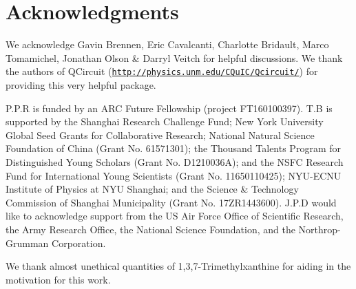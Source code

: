 %
%

\section*{Acknowledgments}

We acknowledge Gavin Brennen, Eric Cavalcanti, Charlotte Bridault, Marco Tomamichel, Jonathan Olson \& Darryl Veitch for helpful discussions. We thank the authors of QCircuit (\texttt{\href{http://physics.unm.edu/CQuIC/Qcircuit/}{http://physics.unm.edu/CQuIC/Qcircuit/}}) for providing this very helpful package.

 P.P.R is funded by an ARC Future Fellowship (project FT160100397). T.B is supported by the Shanghai Research Challenge Fund; New York University Global Seed Grants for Collaborative Research; National Natural Science Foundation of China (Grant No. 61571301); the Thousand Talents Program for Distinguished Young Scholars (Grant No. D1210036A); and the NSFC Research Fund for International Young Scientists (Grant No. 11650110425); NYU-ECNU Institute of Physics at NYU Shanghai; and the Science \& Technology Commission of Shanghai Municipality (Grant No. 17ZR1443600). J.P.D would like to acknowledge support from the US Air Force Office of Scientific Research, the Army Research Office, the National Science Foundation, and the Northrop-Grumman Corporation.

We thank almost unethical quantities of 1,3,7-Trimethylxanthine for aiding in the motivation for this work.